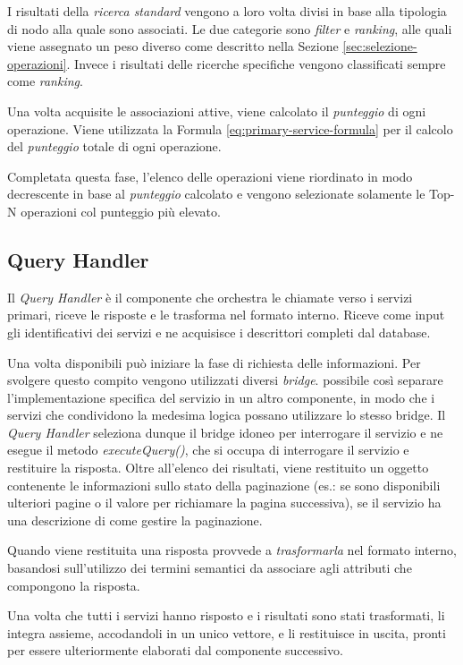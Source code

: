 I risultati della \emph{ricerca standard} vengono a loro volta divisi in base alla tipologia di nodo alla quale sono associati. Le due categorie sono \emph{filter} e \emph{ranking}, alle quali viene assegnato un peso diverso come descritto nella Sezione \ref{sec:selezione-operazioni}. Invece i risultati delle ricerche specifiche vengono classificati sempre come \emph{ranking}.

Una volta acquisite le associazioni attive, viene calcolato il \emph{punteggio} di ogni operazione. Viene utilizzata la Formula \ref{eq:primary-service-formula} per il calcolo del \emph{punteggio} totale di ogni operazione.

Completata questa fase, l'elenco delle operazioni viene riordinato in modo decrescente in base al \emph{punteggio} calcolato e vengono selezionate solamente le Top-N operazioni col punteggio più elevato. 

\subsection{Query Handler\label{sec:query-handler}}

Il \emph{Query Handler} è il componente che orchestra le chiamate verso i servizi primari, riceve le risposte e le trasforma nel formato interno. Riceve come input gli identificativi dei servizi e ne acquisisce i descrittori completi dal database.

Una volta disponibili può iniziare la fase di richiesta delle informazioni. Per svolgere questo compito vengono utilizzati diversi \emph{bridge}. \upe possibile così separare l'implementazione specifica del servizio in un altro componente, in modo che i servizi che condividono la medesima logica possano utilizzare lo stesso bridge. Il \emph{Query Handler} seleziona dunque il bridge idoneo per interrogare il servizio e ne esegue il metodo \emph{executeQuery()}, che si occupa di interrogare il servizio e restituire la risposta. Oltre all'elenco dei risultati, viene restituito un oggetto contenente le informazioni sullo stato della paginazione (es.: se sono disponibili ulteriori pagine o il valore per richiamare la pagina successiva), se il servizio ha una descrizione di come gestire la paginazione.

Quando viene restituita una risposta provvede a \emph{trasformarla} nel formato interno, basandosi sull'utilizzo dei termini semantici da associare agli attributi che compongono la risposta.

Una volta che tutti i servizi hanno risposto e i risultati sono stati trasformati, li integra assieme, accodandoli in un unico vettore, e li restituisce in uscita, pronti per essere ulteriormente elaborati dal componente successivo.

